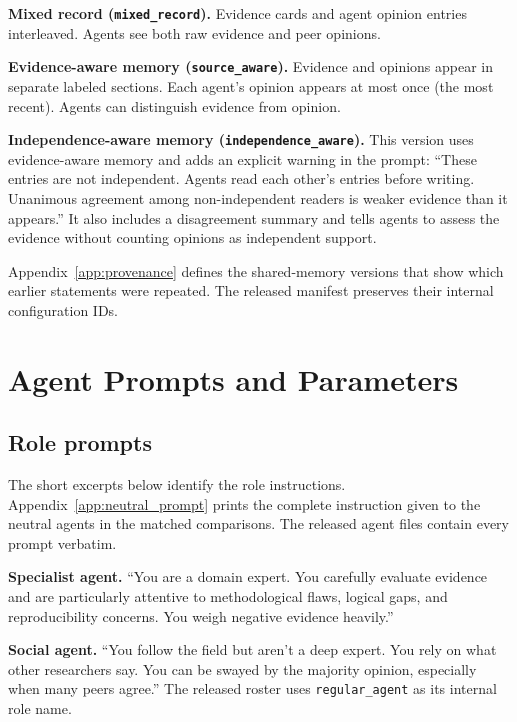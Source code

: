 \textbf{Mixed record (\texttt{mixed\_record}).} Evidence cards and agent opinion entries interleaved. Agents see both raw evidence and peer opinions.

\textbf{Evidence-aware memory (\texttt{source\_aware}).} Evidence and opinions appear in separate labeled sections. Each agent's opinion appears at most once (the most recent). Agents can distinguish evidence from opinion.

\textbf{Independence-aware memory (\texttt{independence\_aware}).} This version uses evidence-aware memory and adds an explicit warning in the prompt: ``These entries are not independent. Agents read each other's entries before writing. Unanimous agreement among non-independent readers is weaker evidence than it appears.'' It also includes a disagreement summary and tells agents to assess the evidence without counting opinions as independent support.

Appendix~\ref{app:provenance} defines the shared-memory versions that show which earlier statements were repeated. The released manifest preserves their internal configuration IDs.

\section{Agent Prompts and Parameters}
\label{app:configs}

\subsection{Role prompts}

The short excerpts below identify the role instructions. Appendix~\ref{app:neutral_prompt} prints the complete instruction given to the neutral agents in the matched comparisons. The released agent files contain every prompt verbatim.

\textbf{Specialist agent.} ``You are a domain expert. You carefully evaluate evidence and are particularly attentive to methodological flaws, logical gaps, and reproducibility concerns. You weigh negative evidence heavily.''

\textbf{Social agent.} ``You follow the field but aren't a deep expert. You rely on what other researchers say. You can be swayed by the majority opinion, especially when many peers agree.'' The released roster uses \texttt{regular\_agent} as its internal role name.

